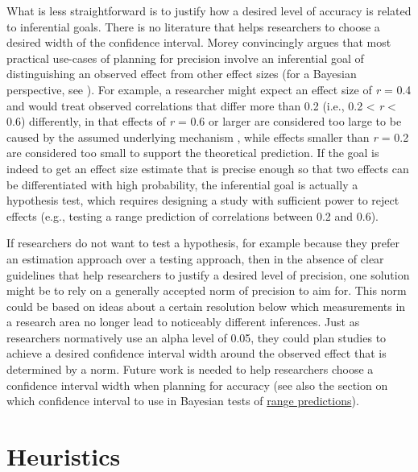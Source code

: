 \documentclass[
  oneside]{book}
\begin{document}
What is less straightforward is to justify how a desired level of accuracy is related to inferential goals. There is no literature that helps researchers to choose a desired width of the confidence interval. Morey \citeyearpar{morey_power_2020} convincingly argues that most practical use-cases of planning for precision involve an inferential goal of distinguishing an observed effect from other effect sizes (for a Bayesian perspective, see \citet{kruschke_rejecting_2018}). For example, a researcher might expect an effect size of \emph{r} = 0.4 and would treat observed correlations that differ more than 0.2 (i.e., 0.2 \textless{} \emph{r} \textless{} 0.6) differently, in that effects of \emph{r} = 0.6 or larger are considered too large to be caused by the assumed underlying mechanism \citep{hilgard_maximal_2021}, while effects smaller than \emph{r} = 0.2 are considered too small to support the theoretical prediction. If the goal is indeed to get an effect size estimate that is precise enough so that two effects can be differentiated with high probability, the inferential goal is actually a hypothesis test, which requires designing a study with sufficient power to reject effects (e.g., testing a range prediction of correlations between 0.2 and 0.6).

If researchers do not want to test a hypothesis, for example because they prefer an estimation approach over a testing approach, then in the absence of clear guidelines that help researchers to justify a desired level of precision, one solution might be to rely on a generally accepted norm of precision to aim for. This norm could be based on ideas about a certain resolution below which measurements in a research area no longer lead to noticeably different inferences. Just as researchers normatively use an alpha level of 0.05, they could plan studies to achieve a desired confidence interval width around the observed effect that is determined by a norm. Future work is needed to help researchers choose a confidence interval width when planning for accuracy (see also the section on which confidence interval to use in Bayesian tests of \protect\hyperlink{whichinterval}{range predictions}).

\hypertarget{heuristics}{%
\section{Heuristics}\label{heuristics}}
\end{document}
